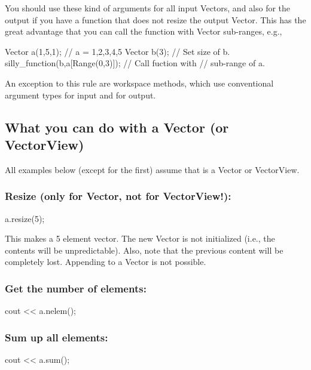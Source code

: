 You should use these kind of arguments for all input Vectors, and also
for the output if you have a function that does not resize the output
Vector. This has the great advantage that you can call the function
with Vector sub-ranges, e.g., 
\begin{code}
Vector a(1,5,1);                  // a = 1,2,3,4,5
Vector b(3);                      // Set size of b.
silly_function(b,a[Range(0,3)]);  // Call fuction with
                                  // sub-range of a.
\end{code}

An exception to this rule are workspace methods, which use
conventional argument types  for input and
 for output.

\subsection{What you can do with a Vector (or VectorView)}

All examples below (except for the first) assume that  is a
Vector or VectorView.

\subsubsection{Resize (only for Vector, not for VectorView!):}
\begin{code}
a.resize(5);
\end{code}
This makes  a 5 element vector. The new Vector is not
initialized (i.e., the contents will be unpredictable). Also, note
that the previous content will be completely lost. Appending to a
Vector is not possible.

\subsubsection{Get the number of elements:}
\begin{code}
cout << a.nelem();
\end{code}

\subsubsection{Sum up all elements:}
\begin{code}
cout << a.sum();
\end{code}

